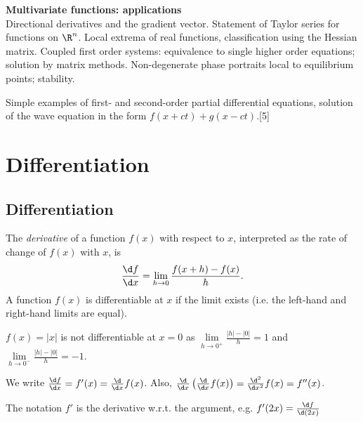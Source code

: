 \documentclass[a4paper]{article}
\begin{document}
{\vspace{10pt}
\noindent\textbf{Multivariate functions: applications}\\
Directional derivatives and the gradient vector. Statement of Taylor series for functions on $\R^n$. Local extrema of real functions, classification using the Hessian matrix. Coupled first order systems: equivalence to single higher order equations; solution by matrix methods. Non-degenerate phase portraits local to equilibrium points; stability.

\vspace{5pt}
\noindent Simple examples of first- and second-order partial differential equations, solution of the wave equation in the form $f(x + ct) + g(x - ct)$.\hspace*{\fill}[5]}
\tableofcontents

\section{Differentiation}
\subsection{Differentiation}
\begin{defi}
  The \emph{derivative} of a function $f(x)$ with respect to $x$, interpreted as the rate of change of $f(x)$ with $x$, is
  \[
  \frac{\d f}{\d x} = \lim_{h\to 0} \frac{f(x + h) - f(x)}{h}.
  \]
  A function $f(x)$ is differentiable at $x$ if the limit exists (i.e. the left-hand and right-hand limits are equal).
\end{defi}

\begin{eg}
  $f(x)=|x|$ is not differentiable at $x = 0$ as $\lim\limits_{h\to 0^+} \frac{|h| - |0|}{h}= 1$ and $\lim\limits_{h\to 0^-} \frac{|h| - |0|}{h}= -1$.
\end{eg}

\begin{notation}
  We write $\frac{\d f}{\d x} = f'(x) = \frac{\d}{\d x} f(x)$. Also, $\frac{\d}{\d x}\left(\frac{\d}{\d x} f(x)\right) = \frac{\d^2}{\d x^2} f(x) = f''(x)$.

\note The notation $f'$ is the derivative w.r.t. the argument, e.g. $f'(2x) = \frac{\d f}{\d (2x)}$
\end{notation}
\end{document}

